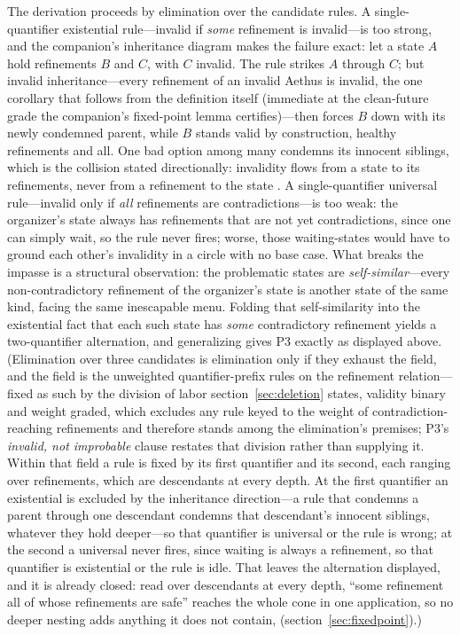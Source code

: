 \documentclass[11pt]{article}
\theoremstyle{definition}
\newcommand{\Aethus}{Aethus}
\begin{document}
The derivation proceeds by elimination over the candidate rules. A single-quantifier existential rule---invalid if \emph{some} refinement is invalid---is too strong, and the companion's inheritance diagram makes the failure exact: let a state $A$ hold refinements $B$ and $C$, with $C$ invalid. The rule strikes $A$ through $C$; but invalid inheritance---every refinement of an invalid \Aethus{} is invalid, the one corollary that follows from the definition itself (immediate at the clean-future grade the companion's fixed-point lemma certifies)---then forces $B$ down with its newly condemned parent, while $B$ stands valid by construction, healthy refinements and all. One bad option among many condemns its innocent siblings, which is the collision stated directionally: invalidity flows from a state to its refinements, never from a refinement to the state \cite{Aethus}. A single-quantifier universal rule---invalid only if \emph{all} refinements are contradictions---is too weak: the organizer's state always has refinements that are not yet contradictions, since one can simply wait, so the rule never fires; worse, those waiting-states would have to ground each other's invalidity in a circle with no base case. What breaks the impasse is a structural observation: the problematic states are \emph{self-similar}---every non-contradictory refinement of the organizer's state is another state of the same kind, facing the same inescapable menu. Folding that self-similarity into the existential fact that each such state has \emph{some} contradictory refinement yields a two-quantifier alternation, and generalizing gives P3 exactly as displayed above.
(Elimination over three candidates is elimination only if they exhaust the field, and the field is the unweighted quantifier-prefix rules on the refinement relation---fixed as such by the division of labor section~\ref{sec:deletion} states, validity binary and weight graded, which excludes any rule keyed to the weight of contradiction-reaching refinements and therefore stands among the elimination's premises; P3's \emph{invalid, not improbable} clause restates that division rather than supplying it. Within that field a rule is fixed by its first quantifier and its second, each ranging over refinements, which are descendants at every depth. At the first quantifier an existential is excluded by the inheritance direction---a rule that condemns a parent through one descendant condemns that descendant's innocent siblings, whatever they hold deeper---so that quantifier is universal or the rule is wrong; at the second a universal never fires, since waiting is always a refinement, so that quantifier is existential or the rule is idle. That leaves the alternation displayed, and it is already closed: read over descendants at every depth, ``some refinement all of whose refinements are safe'' reaches the whole cone in one application, so no deeper nesting adds anything it does not contain, (section~\ref{sec:fixedpoint}).)
\end{document}
